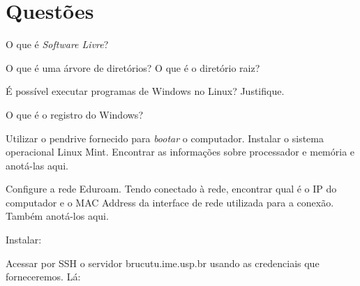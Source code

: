 


\siheader
\section*{Questões}
\begin{questions}

\question
O que é \textit{Software Livre}?
\vfill

\question
O que é uma árvore de diretórios? O que é o diretório raiz?
\vfill

\question
É possível executar programas de Windows no Linux? Justifique.
\vfill

\question
O que é o registro do Windows?
\vfill

\question
Utilizar o pendrive fornecido para \emph{bootar} o computador. Instalar o sistema operacional Linux Mint. Encontrar as informações sobre processador e memória e anotá-las aqui.
\vfill

\question
Configure a rede Eduroam. Tendo conectado à rede, encontrar qual é o IP do computador e o MAC Address da interface de rede utilizada para a conexão. Também anotá-los aqui.
\vfill

\question
Instalar:

\question
Acessar por SSH o servidor brucutu.ime.usp.br usando as credenciais que forneceremos. Lá:

\end{questions}

